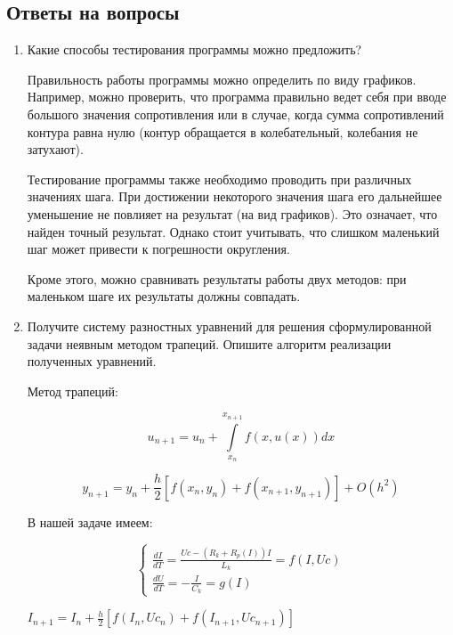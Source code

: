 \documentclass[a4paper,14pt]{article}
\begin{document}
\newpage
\subsection*{Ответы на вопросы}

\begin{enumerate}
	\item Какие способы тестирования программы можно предложить?
	
	Правильность работы программы можно определить по виду графиков. Например,
можно проверить, что программа правильно ведет себя при вводе большого значения
сопротивления или в случае, когда сумма сопротивлений контура равна нулю (контур
обращается в колебательный, колебания не затухают).

	Тестирование программы также необходимо проводить при различных значениях шага. При достижении некоторого значения шага его дальнейшее уменьшение не повлияет на результат (на вид графиков). Это означает, что найден точный результат. Однако стоит учитывать, что слишком маленький шаг может привести к погрешности округления.
	
	Кроме этого, можно сравнивать результаты работы двух методов: при маленьком шаге их результаты должны совпадать.
	
	\item Получите систему разностных уравнений для решения сформулированной задачи неявным методом трапеций. Опишите  алгоритм реализации полученных уравнений.

Метод трапеций:

\begin{equation*}
 u_{n+1} = u_n + \int\limits_{x_n}^{x_{n+1}}f(x, u(x))dx 
\end{equation*}

\begin{equation*}
 y_{n+1} = y_n + \frac{h}{2}[f(x_n, y_n) + f(x_{n+1}, y_{n+1})] + O(h^2)
\end{equation*}

В нашей задаче имеем:

\begin{equation*}
 \begin{cases}
   \frac{dI}{dT} = \frac{Uc - (R_k + R_p(I))I}{L_k} = f(I, Uc)\\
   \frac{dU}{dT} = -\frac{I}{C_k} = g(I)
 \end{cases}
\end{equation*}


$ I_{n+1} = I_n + \frac{h}{2}[f(I_n, Uc_n) + f(I_{n+1}, Uc_{n+1})]$ 
 

\end{enumerate}
\end{document}
